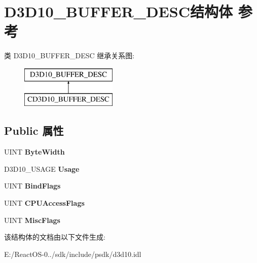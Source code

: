 \hypertarget{struct_d3_d10___b_u_f_f_e_r___d_e_s_c}{}\section{D3\+D10\+\_\+\+B\+U\+F\+F\+E\+R\+\_\+\+D\+E\+S\+C结构体 参考}
\label{struct_d3_d10___b_u_f_f_e_r___d_e_s_c}
类 D3\+D10\+\_\+\+B\+U\+F\+F\+E\+R\+\_\+\+D\+E\+SC 继承关系图\+:\begin{figure}[H]
\begin{center}
\leavevmode
\includegraphics[height=2.000000cm]{struct_d3_d10___b_u_f_f_e_r___d_e_s_c}
\end{center}
\end{figure}
\subsection*{Public 属性}
\begin{DoxyCompactItemize}
\item 
\mbox{\label{struct_d3_d10___b_u_f_f_e_r___d_e_s_c_a1f9b96cc354fa0edcda17f158936fa78}} 
U\+I\+NT {\bfseries Byte\+Width}
\item 
\mbox{\label{struct_d3_d10___b_u_f_f_e_r___d_e_s_c_a5ce216c879d0c470f4d31710bcd1b1cc}} 
D3\+D10\+\_\+\+U\+S\+A\+GE {\bfseries Usage}
\item 
\mbox{\label{struct_d3_d10___b_u_f_f_e_r___d_e_s_c_a239c3431ff72a1ca25dcb0020f927cb4}} 
U\+I\+NT {\bfseries Bind\+Flags}
\item 
\mbox{\label{struct_d3_d10___b_u_f_f_e_r___d_e_s_c_afd4dc3d3d86c61d43c8500223fe14365}} 
U\+I\+NT {\bfseries C\+P\+U\+Access\+Flags}
\item 
\mbox{\label{struct_d3_d10___b_u_f_f_e_r___d_e_s_c_a9632440e280c232330c8db65b33f5832}} 
U\+I\+NT {\bfseries Misc\+Flags}
\end{DoxyCompactItemize}


该结构体的文档由以下文件生成\+:\begin{DoxyCompactItemize}
\item 
E\+:/\+React\+O\+S-\/0../sdk/include/psdk/d3d10.\+idl\end{DoxyCompactItemize}
